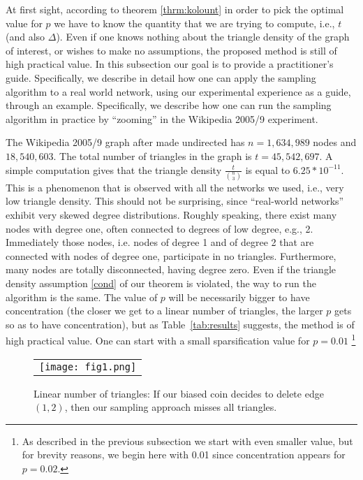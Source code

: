 \documentclass{llncs}
\begin{document}
At first sight, according to theorem \ref{thrm:kolount} in order to pick the optimal value for 
$p$ we have to know the quantity that we are trying to compute, i.e., $t$ (and also $\Delta$). 
Even if one knows nothing about the triangle density of the graph of interest, or wishes
to make no assumptions, the proposed method is still of high practical value. 
In this subsection our goal is to provide a practitioner's guide. 
Specifically, we describe in detail how one can apply the sampling algorithm to 
a real world network, using our experimental experience as a guide, through an example.
Specifically, we describe how one can run the sampling algorithm in practice
by ``zooming'' in the Wikipedia 2005/9 experiment. 


The Wikipedia 2005/9 graph after made undirected has $n=1,634,989$ nodes 
and $18,540,603$. The total number of triangles in the graph is $t=45,542,697$.
A simple computation gives that the triangle density $\frac{t}{{n \choose 3}}$ is 
equal to $6.25*10^{-11}$. This is a phenomenon that is observed with all the 
networks we used, i.e., very low triangle density. This should not be surprising, 
since ``real-world networks'' exhibit very skewed degree distributions. 
Roughly speaking, there exist many nodes with degree one, often connected to degrees of low
degree, e.g., 2. Immediately those nodes, i.e. nodes of degree 1 and of degree 2 that 
are connected with nodes of degree one, participate in no triangles. Furthermore, 
many nodes are totally disconnected, having degree zero. 
Even if the triangle density assumption  \eqref{cond} of our theorem is violated, 
the way to run the algorithm is the same. The value of $p$ will be necessarily bigger
to have concentration (the closer we get to a linear number of triangles, the larger $p$ gets
so as to have concentration), but as Table~\ref{tab:results} suggests, the method 
is of high practical value. 
One can start with a small sparsification value for $p=0.01$ \footnote{As described in the previous
subsection we start with even smaller value, but for brevity reasons, we begin here with 0.01 since concentration
appears for $p=0.02$.}

\begin{figure}
    \begin{center}
        \begin{tabular}{c}
        \texttt{[image: fig1.png]} \\
	  \end{tabular}	    
		\caption{ Linear number of triangles: If our biased coin decides to delete edge $(1,2)$, then our sampling approach misses all triangles.  }
		\end{center}
	\label{fig:fig1}
\end{figure}
\end{document}
